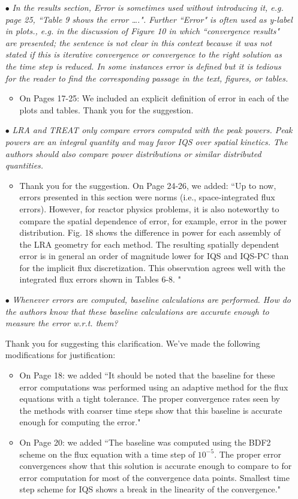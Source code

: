 \documentclass[11pt]{letter}
\newcommand{\iqspc}{IQS-PC\xspace}
\newcommand{\done}{$\bullet$}
\newcommand{\easy}[1]{{\textit{#1}}}
\newcommand{\medm}[1]{{\textit{#1}}}
\newcommand{\hard}[1]{{\textit{#1}}}
\begin{document}
\begin{itemize}
\item[\done] \easy{ In the results section, Error is sometimes used without introducing it, e.g. page 25, ``Table 9 shows the error ….". Further ``Error" is often used as y-label in plots., e.g. in the discussion of Figure 10 in which ``convergence results" are presented; the sentence is not clear in this context because it was not stated if this is iterative convergence or convergence to the right solution as the time step is reduced. In some instances error is defined but it is tedious for the reader to find the corresponding passage in the text, figures, or tables. }
\begin{itemize}
\item On  Pages 17-25: We included an explicit definition of error in each of the plots and tables. Thank you for the suggestion.
\end{itemize}

\item[\done] \hard{ LRA and TREAT only compare errors computed with the peak powers. Peak powers are an integral quantity and may favor IQS over spatial kinetics. The authors should also compare power distributions or similar distributed quantities. }
\begin{itemize}
\item Thank you for the suggestion. On Page 24-26, we added: ``Up to now, errors presented in this section were norms (i.e., space-integrated flux errors). However, for reactor physics problems, it is also noteworthy to compare the spatial dependence of error, for example, error in the power distribution. Fig. 18 shows the difference in power for each assembly of the LRA geometry for each method. The resulting spatially dependent error is in general an order of magnitude lower for IQS and \iqspc than for the implicit flux discretization. This observation agrees well with the integrated flux errors shown in Tables 6-8. "
\end{itemize}

\item[\done] \medm{  Whenever errors are computed, baseline calculations are performed. How do the authors know that these baseline calculations are accurate enough to measure the error w.r.t. them? }

Thank you for suggesting this clarification. We've made the following modifications for justification:
\begin{itemize}
\item On Page 18: we added ``It should be noted that the baseline for these error computations was performed using an adaptive method for the flux equations with a tight tolerance. The proper convergence rates seen by the methods with coarser time steps show that this baseline is accurate enough for computing the error."
\item On Page 20: we added ``The baseline was computed using the BDF2 scheme on the flux equation with a time step of $10^{-5}$. The proper error convergences show that this solution is accurate enough to compare to for error computation for most of the convergence data points. Smallest time step scheme for IQS shows a break in the linearity of the convergence."
\end{itemize}


\end{itemize}
\end{document}
